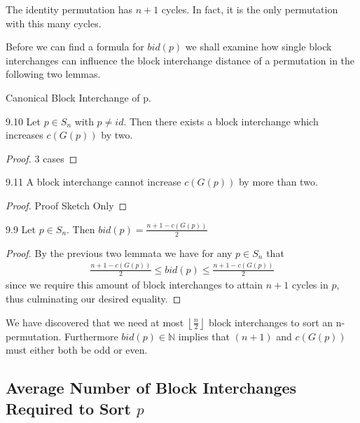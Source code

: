\begin{remark}
The identity permutation has $n+1$ cycles. In fact, it is the only permutation with this many cycles.
\end{remark}

Before we can find a formula for $bid(p)$ we shall examine how single block interchanges can influence the block interchange distance of a permutation in the following two lemmas.

\begin{definition}
Canonical Block Interchange of p.
\end{definition}

\begin{lemma}
9.10
Let $p \in S_n$ with $p \neq id$. Then there exists a block interchange which increases $c(G(p))$ by two.
\end{lemma}

\begin{proof}
3 cases
\end{proof}

\begin{lemma}
9.11
A block interchange cannot increase $c(G(p))$ by more than two.
\end{lemma}

\begin{proof}
Proof Sketch Only
\end{proof}

\begin{theorem}
9.9
Let $p \in S_n$. Then $bid(p) = \frac{n+1-c(G(p))}{2}$
\end{theorem}

\begin{proof}
By the previous two lemmata we have for any $p \in S_n$ that
\begin{align*}
\frac{n+1-c(G(p))}{2} \leq bid(p) \leq \frac{n+1-c(G(p))}{2}
\end{align*}
since we require this amount of block interchanges to attain $n+1$ cycles in $p$, thus culminating our desired equality.
\end{proof}

\begin{remark}
We have discovered that we need at most $\left \lfloor{\frac{n}{2}}\right \rfloor $ block interchanges to sort an n-permutation. Furthermore $bid(p) \in \mathbb{N}$ implies that $(n+1)$ and $c(G(p))$ must either both be odd or even.
\end{remark}


\subsection{Average Number of Block Interchanges Required to Sort $p$}


